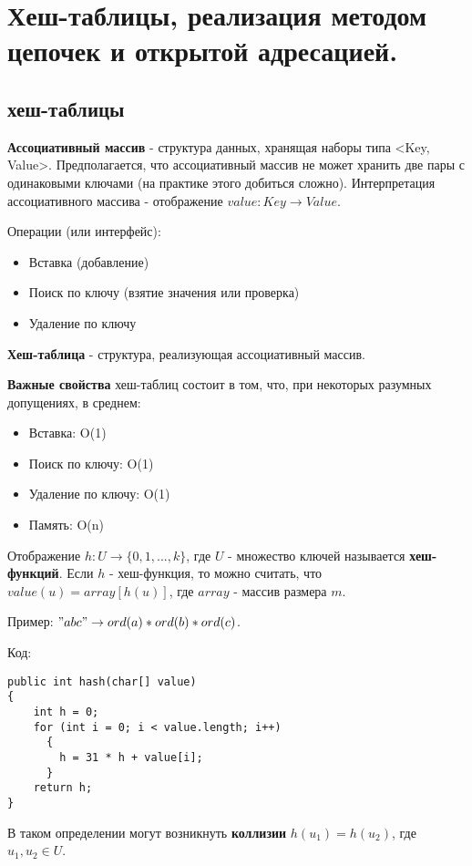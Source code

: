\section{Хеш-таблицы, реализация методом цепочек и открытой адресацией.}

\subsection*{хеш-таблицы}

{\bf Ассоциативный массив} - структура данных, хранящая наборы типа <Key, Value>. 
Предполагается, что ассоциативный массив не может хранить две пары с одинаковыми ключами (на практике этого добиться сложно).
Интерпретация ассоциативного массива - отображение $value: Key \rightarrow Value$.

Операции (или интерфейс):
\begin{itemize}
\item Вставка (добавление)
\item Поиск по ключу (взятие значения или проверка)
\item Удаление по ключу
\end{itemize}

{\bf Хеш-таблица} - структура, реализующая ассоциативный массив.

{\bf Важные свойства} хеш-таблиц состоит в том, что, при некоторых разумных допущениях, в среднем:
\begin{itemize}
\item Вставка: O(1)
\item Поиск по ключу: O(1)
\item Удаление по ключу: O(1)
\item Память: O(n)
\end{itemize}

Отображение $h: U \rightarrow \{0, 1, ..., k\}$, где $U$ - множество ключей называется {\bf хеш-функций}.
Если $h$ - хеш-функция, то можно считать, что $value(u) = array[h(u)]$, где $array$ - массив размера $m$.

Пример:
$"abc" \rightarrow ord(a)*ord(b)*ord(c)$.

Код:
\begin{verbatim}
public int hash(char[] value) 
{
    int h = 0;
    for (int i = 0; i < value.length; i++) 
      {
        h = 31 * h + value[i];
      }
    return h;
}
\end{verbatim}

В таком определении могут возникнуть {\bf коллизии} $h(u_1) = h(u_2)$, где $u_1, u_2 \in U$.

